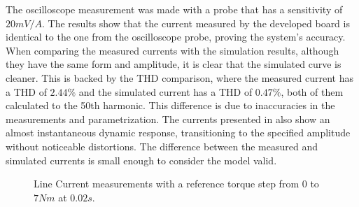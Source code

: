 \documentclass[9pt,conference]{IEEEtran}
\begin{document}
 The oscilloscope measurement was made with a probe that has a sensitivity of $20mV/A$. The results show that the current measured by the developed board is identical to the one from the oscilloscope probe, proving the system's accuracy. When comparing the measured currents with the simulation results, although they have the same form and amplitude, it is clear that the simulated curve is cleaner. This is backed by the THD comparison, where the measured current has a THD of $2.44\%$ and the simulated current has a THD of $0.47\%$, both of them calculated to the 50th harmonic. This difference is due to inaccuracies in the measurements and parametrization. 
 The currents presented in  also show an almost instantaneous dynamic response, transitioning to the specified amplitude without noticeable distortions. The difference between the measured and simulated currents is small enough to consider the model valid.
\begin{figure}[!htb]
	\begin{subfigmatrix}{2}
	\end{subfigmatrix}
	\caption{Line Current measurements with a reference torque step from $0$ to $7Nm$ at $0.02s$.}
	\label{fig:tq_step_fig} %
\end{figure}
\end{document}
